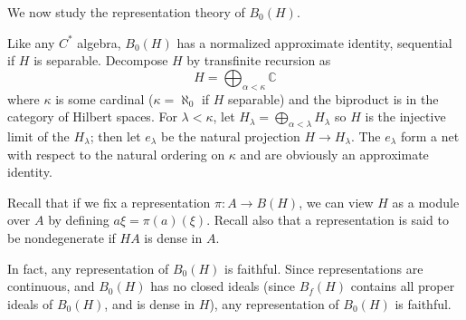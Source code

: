 \documentclass[12pt]{report}
\newcommand{\CC}{\mathbb{C}}
\theoremstyle{definition}
\begin{document}
We now study the representation theory of $B_0(H)$.

Like any $C^*$ algebra, $B_0(H)$ has a normalized approximate identity, sequential if $H$ is separable. Decompose $H$ by transfinite recursion as
$$H = \bigoplus_{\alpha < \kappa} \CC$$
where $\kappa$ is some cardinal ($\kappa = \aleph_0$ if $H$ separable) and the biproduct is in the category of Hilbert spaces. For $\lambda < \kappa$, let $H_\lambda = \bigoplus_{\alpha < \lambda} H_\lambda$ so $H$ is the injective limit of the $H_\lambda$; then let $e_\lambda$ be the natural projection $H \to H_\lambda$. The $e_\lambda$ form a net with respect to the natural ordering on $\kappa$ and are obviously an approximate identity.

Recall that if we fix a representation $\pi: A \to B(H)$, we can view $H$ as a module over $A$ by defining $a\xi = \pi(a)(\xi)$. Recall also that a representation is said to be nondegenerate if $HA$ is dense in $A$.

In fact, any representation of $B_0(H)$ is faithful. Since representations are continuous, and $B_0(H)$ has no closed ideals (since $B_f(H)$ contains all proper ideals of $B_0(H)$, and is dense in $H$), any representation of $B_0(H)$ is faithful.
\end{document}
